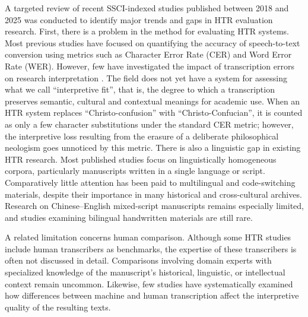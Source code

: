 \documentclass[final]{anthology-ch} %
\begin{document}
A targeted review of recent SSCI-indexed studies published between 2018 and 2025 was conducted to identify major trends and gaps in HTR evaluation research. First, there is a problem in the method for evaluating HTR systems. Most previous studies have focused on quantifying the accuracy of speech-to-text conversion using metrics such as Character Error Rate (CER) and Word Error Rate (WER). However, few have investigated the impact of transcription errors on research interpretation \cite{nockels2022understanding}. The field does not yet have a system for assessing what we call \enquote{interpretive fit}, that is, the degree to which a transcription preserves semantic, cultural and contextual meanings for academic use. When an HTR system replaces \enquote{Christo-confusion} with \enquote{Christo-Confucian}, it is counted as only a few character substitutions under the standard CER metric; however, the interpretive loss resulting from the erasure of a deliberate philosophical neologism goes unnoticed by this metric. There is also a linguistic gap in existing HTR research. Most published studies focus on linguistically homogeneous corpora, particularly manuscripts written in a single language or script. Comparatively little attention has been paid to multilingual and code-switching materials, despite their importance in many historical and cross-cultural archives. Research on Chinese--English mixed-script manuscripts remains especially limited, and studies examining bilingual handwritten materials are still rare.

A related limitation concerns human comparison. Although some HTR studies include human transcribers as benchmarks, the expertise of these transcribers is often not discussed in detail. Comparisons involving domain experts with specialized knowledge of the manuscript's historical, linguistic, or intellectual context remain uncommon. Likewise, few studies have systematically examined how differences between machine and human transcription affect the interpretive quality of the resulting texts.
\end{document}
